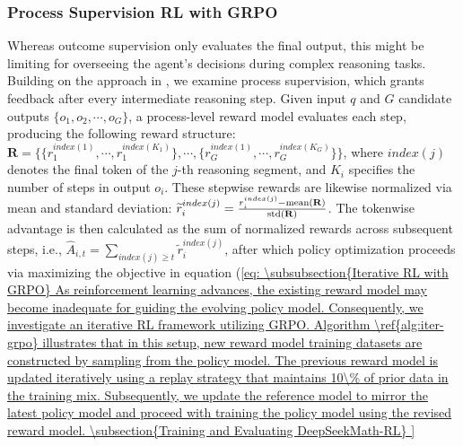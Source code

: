 \subsubsection{Process Supervision RL with GRPO} Whereas outcome supervision only evaluates the final output, this might be limiting for overseeing the agent's decisions during complex reasoning tasks. Building on the approach in \cite{wang2023math}, we examine process supervision, which grants feedback after every intermediate reasoning step. Given input $q$ and $G$ candidate outputs $\{o_1, o_2, \cdots, o_G\}$, a process-level reward model evaluates each step, producing the following reward structure: $\mathbf{R} = \{ \{r_1^{index(1)},\cdots,r_1^{index(K_1)}\}, \cdots,  \{r_G^{index(1)},\cdots,r_G^{index(K_G)}\} \}$, where $index(j)$ denotes the final token of the $j$-th reasoning segment, and $K_i$ specifies the number of steps in output $o_i$. These stepwise rewards are likewise normalized via mean and standard deviation: $\widetilde{r}_i^{index(j)} = \frac{r_i^{index(j)} - {\rm mean(\mathbf{R})}}{{\rm std(\mathbf{R})}}$. The tokenwise advantage is then calculated as the sum of normalized rewards across subsequent steps, i.e., $\hat{A}_{i, t} = \sum_{index(j) \ge t} \widetilde{r}_i^{index(j)}$, after which policy optimization proceeds via maximizing the objective in equation (\ref{eq:

\subsubsection{Iterative RL with GRPO} As reinforcement learning advances, the existing reward model may become inadequate for guiding the evolving policy model. Consequently, we investigate an iterative RL framework utilizing GRPO. Algorithm \ref{alg:iter-grpo} illustrates that in this setup, new reward model training datasets are constructed by sampling from the policy model. The previous reward model is updated iteratively using a replay strategy that maintains 10\% of prior data in the training mix. Subsequently, we update the reference model to mirror the latest policy model and proceed with training the policy model using the revised reward model.

\subsection{Training and Evaluating DeepSeekMath-RL}

}
